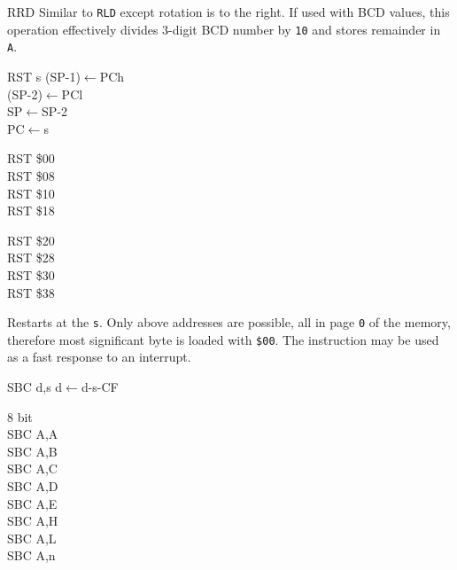 \documentclass[12pt,twoside,openright,a4paper]{book}
\begin{document}
\begin{basedescript}{
	\desclabelstyle{\multilinelabel}
	\desclabelwidth{3cm}}
\begin{detailitem}{RRD}
		Similar to {\tt RLD} except rotation is to the right. If used with BCD values, this operation effectively divides 3-digit BCD number by {\tt 10} and stores remainder in {\tt A}.

		\begin{DetailEffects}[p]
		\end{DetailEffects}
						
		\begin{DetailTiming}
		\end{DetailTiming}

	\end{detailitem}

	\begin{detailitem}{RST s}
		{(SP-1)$\leftarrow$PCh\\
		(SP-2)$\leftarrow$PCl\\
		SP$\leftarrow$SP-2\\
		PC$\leftarrow$s}

		\begin{DetailVariants}
			RST \$00\\
			RST \$08\\
			RST \$10\\
			RST \$18
			
			\columnbreak
			RST \$20\\
			RST \$28\\
			RST \$30\\
			RST \$38
		\end{DetailVariants}

		Restarts at the {\tt s}. Only above addresses are possible, all in page {\tt 0} of the memory, therefore most significant byte is loaded with {\tt \$00}. The instruction may be used as a fast response to an interrupt.

		\DetailNoEffect
						
		\begin{DetailTiming}
			\DetailTime{}{3}{11}
		\end{DetailTiming}

	\end{detailitem}

	\pagebreak
	\begin{detailitem}{SBC d,s}
		{d$\leftarrow$d-s-CF}
	
		\begin{DetailVariants}
			\textnormal{8 bit}\\
			SBC A,A\\
			SBC A,B\\
			SBC A,C\\
			SBC A,D\\
			SBC A,E\\
			SBC A,H\\
			SBC A,L\\
			SBC A,n


\end{DetailVariants}
\end{detailitem}
\end{basedescript}
\end{document}
